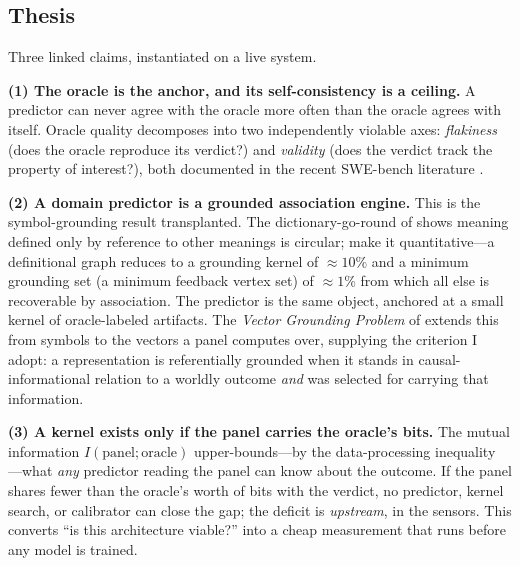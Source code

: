 \documentclass[10pt,twocolumn]{article}
\begin{document}
\subsection{Thesis}
Three linked claims, instantiated on a live system.

\textbf{(1) The oracle is the anchor, and its self-consistency is a ceiling.} A
predictor can never agree with the oracle more often than the oracle agrees with
itself. Oracle quality decomposes into two independently violable axes:
\emph{flakiness} (does the oracle reproduce its verdict?) and \emph{validity}
(does the verdict track the property of interest?), both documented in the recent
SWE-bench literature \citep{aleithan2024swebenchplus, wang2025solved,
openai2026swebench}.

\textbf{(2) A domain predictor is a grounded association engine.} This is the
symbol-grounding result transplanted. The dictionary-go-round of
\citet{harnad1990symbol} shows meaning defined only by reference to other meanings
is circular; \citet{vincentlamarre2016latent} make it
quantitative---a definitional graph reduces to a grounding kernel of
$\approx10\%$ and a minimum grounding set (a minimum feedback vertex set) of
$\approx1\%$ from which all else is recoverable by association. The predictor is
the same object, anchored at a small kernel of oracle-labeled artifacts. The
\emph{Vector Grounding Problem} of \citet{mollo2023vector} extends
this from symbols to the vectors a panel computes over, supplying the criterion I
adopt: a representation is referentially grounded when it stands in
causal-informational relation to a worldly outcome \emph{and} was selected for
carrying that information.

\textbf{(3) A kernel exists only if the panel carries the oracle's bits.} The
mutual information $I(\text{panel};\text{oracle})$ upper-bounds---by the
data-processing inequality \citep{cover2006elements}---what \emph{any} predictor
reading the panel can know about the outcome. If the panel shares fewer than the
oracle's worth of bits with the verdict, no predictor, kernel search, or
calibrator can close the gap; the deficit is \emph{upstream}, in the sensors.
This converts ``is this architecture viable?'' into a cheap measurement that runs
before any model is trained.
\end{document}
